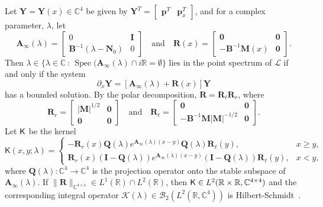 \documentclass{birkjour}
\theoremstyle{definition}
\theoremstyle{remark}
\numberwithin{equation}{section}
\begin{document}
Let $\mathbf Y=\mathbf Y(x) \in \mathbb C^4$ be given by 
$\mathbf Y^T= \begin{bmatrix} \mathbf p^T & \mathbf p_x^T \end{bmatrix}$, and 
for a complex parameter, $\lambda$, let
\begin{equation}\label{A}
     \mathbf{A}_\infty(\lambda) = \begin{bmatrix}
     0 & \mathbf{I}\\ \mathbf{B}^{-1}(\lambda - \mathbf{N}_0) & 0
     \end{bmatrix} 
     \quad \text{and} \quad
        \mathbf{R}(x) = \begin{bmatrix}
    \mathbf{0} & \mathbf{0}\\ -\mathbf{B}^{-1}\mathbf{M}(x) & \mathbf{0}
    \end{bmatrix}.
 \end{equation}
Then  $\lambda \in \{ \lambda \in \mathbb C \,:\,\operatorname{Spec}(\mathbf A_\infty(\lambda) \cap i \mathbb R = \emptyset\}$ lies in the point spectrum of 
$\mathcal{L}$ if and only if the system
\begin{equation}\label{systempert}
    \partial_x \mathbf{Y} = [\mathbf{A}_{\infty}(\lambda) + \mathbf{R}(x)]\mathbf{Y}
\end{equation}
has a bounded solution. 
By the polar decomposition,  
$\mathbf R=\mathbf R_\ell \mathbf R_r$, where
\begin{equation}\label{Rrnorm}
    \mathbf{R}_r = \begin{bmatrix}
    |\mathbf{M}|^{1/2} & \mathbf{0}\\ \mathbf{0} & \mathbf{0}
    \end{bmatrix}
    \quad
    \text{and}
    \quad
    \mathbf{R}_{\ell}  = \begin{bmatrix}
    \mathbf{0} & \mathbf{0}\\ -\mathbf{B}^{-1}\mathbf{M}|\mathbf{M}|^{-1/2} & \mathbf{0}
    \end{bmatrix}.
\end{equation}
Let $\textsf K$ be the kernel 
\begin{equation}
\nonumber
    \textsf{K}(x,y;\lambda) = \begin{cases}
    -\mathbf{R}_{r}(x)\mathbf{Q}(\lambda)e^{\mathbf{A}_{\infty}(\lambda)(x-y)}\mathbf{Q}(\lambda)\mathbf{R}_{\ell}(y), & x \geq y,\\
    \mathbf{R}_r(x)(\mathbf{I}-\mathbf{Q}(\lambda))e^{\mathbf{A}_{\infty}(\lambda)(x-y)}(\mathbf{I} - \mathbf{Q}(\lambda))\mathbf{R}_{\ell}(y), & x < y,
    \end{cases}
\end{equation}
where $\mathbf Q(\lambda): \mathbb C^4 \to \mathbb C^4$ is the projection operator  onto the stable subspace of 
$\mathbf A_\infty(\lambda)$.
If  $\|\mathbf{R}\|_{\mathbb{C}^{4 \times 4}} \in L^1(\mathbb{R}) \cap L^2(\mathbb{R})$, then
$\textsf K \in L^2(\mathbb R \times \mathbb R, \mathbb C^{4\times 4})$
and the corresponding integral operator $\mathcal K(\lambda) \in \mathcal B_2(L^2(\mathbb R, \mathbb C^4))$ is Hilbert-Schmidt~\cite{EJF}.
\end{document}
